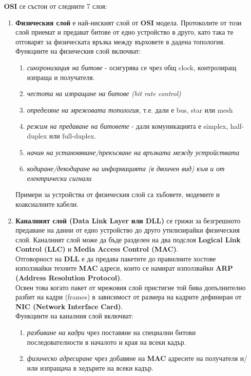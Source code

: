 \documentclass[fleqn,12pt]{article}
\begin{document}
\textbf{OSI} се състои от следните 7 слоя:
\begin{enumerate}
    \item \textbf{Физическия слой} е най-ниският слой от \textbf{OSI} модела. Протоколите от този слой приемат и предават битове от едно устройство в друго, като така те отговарят за
    физическата връзка между върховете в дадена топология. Функциите на физическия слой включват:
    \begin{enumerate}
        \item \textit{синхронизация на битове} - осигурява се чрез общ clock, контролиращ изпраща и получателя.
        \item \textit{честота на изпращане на битове (bit rate control)}
        \item \textit{определяне на мрежовата топология}, т.е. дали е bus, star или mesh
        \item \textit{режим на предаване на битовете} - дали комуникацията е simplex, half-duplex или full-duplex.
        \item \textit{начин на установяване/прекъсване на връзката между устройствата}
        \item \textit{кодиране/декодиране на информацията (в двоичен вид) към и от електрически сигнали}
    \end{enumerate}
    Примери за устройства от физическия слой са хъбовете, модемите и коаксиалните кабели.
    \item \textbf{Каналният слой (Data Link Layer или DLL)} се грижи за безгрешното предаване на данни от едно устройство до друго утилизирайки физическия слой.
    Каналният слой може да бъде разделен на два подслоя \textbf{Logical Link Control (LLC)} и \textbf{Media Access Control (MAC)}.\\
    Отговорност на \textbf{DLL} е да предава пакетите до правилните хостове използвайки техните \textbf{MAC} адреси, които се намират използвайки \textbf{ARP (Address Resolution Protocol)}.\\
    Освен това когато пакет от мрежовия слой пристигне той бива допълнително разбит на кадри (frames) в зависимост от размера на кадрите дефиниран от \textbf{NIC (Network Interface Card)}.\\
    Функциите на каналния слой включват:
    \begin{enumerate}
        \item \textit{разбиване на кадри} чрез поставяне на специални битови последователности в началото и края на всеки кадър.
        \item \textit{физическо адресиране} чрез добавяне на \textbf{MAC} адресите на получателя и/или изпращача в хедърите на всеки кадър.

\end{enumerate}
\end{enumerate}
\end{document}
